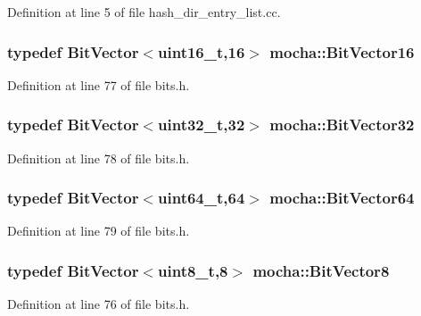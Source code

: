 Definition at line 5 of file hash\_\-dir\_\-entry\_\-list.cc.

\hypertarget{namespacemocha_a766cbe23669a9d992b9ad1ff319262ae}{
\subsubsection[{BitVector16}]{\setlength{\rightskip}{0pt plus 5cm}typedef {\bf BitVector}$<$uint16\_\-t,16$>$ {\bf mocha::BitVector16}}}
\label{namespacemocha_a766cbe23669a9d992b9ad1ff319262ae}


Definition at line 77 of file bits.h.

\hypertarget{namespacemocha_a9b5b10536bdac60b1d8c875d99d1d038}{
\subsubsection[{BitVector32}]{\setlength{\rightskip}{0pt plus 5cm}typedef {\bf BitVector}$<$uint32\_\-t,32$>$ {\bf mocha::BitVector32}}}
\label{namespacemocha_a9b5b10536bdac60b1d8c875d99d1d038}


Definition at line 78 of file bits.h.

\hypertarget{namespacemocha_a83b19de3bb834f897eb5feacd5688a37}{
\subsubsection[{BitVector64}]{\setlength{\rightskip}{0pt plus 5cm}typedef {\bf BitVector}$<$uint64\_\-t,64$>$ {\bf mocha::BitVector64}}}
\label{namespacemocha_a83b19de3bb834f897eb5feacd5688a37}


Definition at line 79 of file bits.h.

\hypertarget{namespacemocha_a0bdb4991eb26767489df7e9d759deb38}{
\subsubsection[{BitVector8}]{\setlength{\rightskip}{0pt plus 5cm}typedef {\bf BitVector}$<$uint8\_\-t,8$>$ {\bf mocha::BitVector8}}}
\label{namespacemocha_a0bdb4991eb26767489df7e9d759deb38}


Definition at line 76 of file bits.h.

